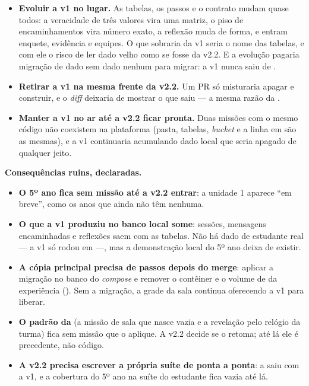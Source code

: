 \begin{itemize}
  \item \textbf{Evoluir a v1 no lugar.} As tabelas, os passos e o contrato
    mudam quase todos: a veracidade de três valores vira uma matriz, o piso de
    encaminhamentos vira número exato, a reflexão muda de forma, e entram
    enquete, evidência e equipes. O que sobraria da v1 seria o nome das tabelas,
    e com ele o risco de ler dado velho como se fosse da v2.2. E a evolução
    pagaria migração de dado sem dado nenhum para migrar: a v1 nunca saiu de
    .
  \item \textbf{Retirar a v1 na mesma frente da v2.2.} Um PR só misturaria
    apagar e construir, e o \emph{diff} deixaria de mostrar o que saiu --- a
    mesma razão da .
  \item \textbf{Manter a v1 no ar até a v2.2 ficar pronta.} Duas missões com o
    mesmo código não coexistem na plataforma (pasta, tabelas, \emph{bucket} e a
    linha em  são as mesmas), e a v1 continuaria acumulando dado
    local que seria apagado de qualquer jeito.
\end{itemize}

\textbf{Consequências ruins, declaradas.}

\begin{itemize}
  \item \textbf{O 5º ano fica sem missão até a v2.2 entrar}: a unidade 1
    aparece \enquote{em breve}, como os anos que ainda não têm nenhuma.
  \item \textbf{O que a v1 produziu no banco local some}: sessões, mensagens
    encaminhadas e reflexões saem com as tabelas. Não há dado de estudante real
    --- a v1 só rodou em  ---, mas a demonstração local do 5º ano
    deixa de existir.
  \item \textbf{A cópia principal precisa de passos depois do merge}: aplicar a
    migração no banco do \emph{compose} e remover o contêiner e o volume de
     da experiência (). Sem a migração, a
    grade da sala continua oferecendo a v1 para liberar.
  \item \textbf{O padrão da } (a missão de sala que nasce vazia e
    a revelação pelo relógio da turma) fica sem missão que o aplique. A v2.2
    decide se o retoma; até lá ele é precedente, não código.
  \item \textbf{A v2.2 precisa escrever a própria suíte de ponta a ponta}: a
     saiu com a v1, e a cobertura do
    5º ano na suíte do estudante fica vazia até lá.
\end{itemize}

